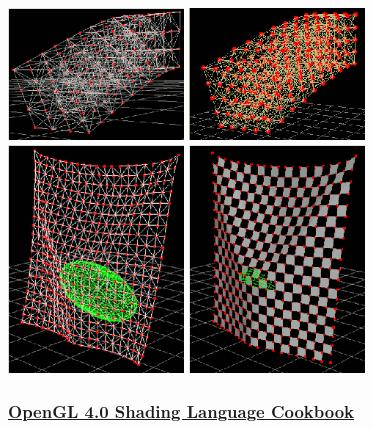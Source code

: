 \documentclass{scrartcl}
\numberwithin{figure}{subsection}
\begin{document}
\begin{center}
  \includegraphics[width=0.35\textwidth]{opencloth1}
  \includegraphics[width=0.35\textwidth]{opencloth2}
  \includegraphics[width=0.35\textwidth]{opencloth3}
  \includegraphics[width=0.35\textwidth]{opencloth4}
\end{center}

\subsubsection{\href{http://www.packtpub.com/opengl-4-0-shading-language-cookbook/book?tag=rk/opengl4-abr1/0811}{OpenGL 4.0 Shading Language Cookbook}}
\end{document}
